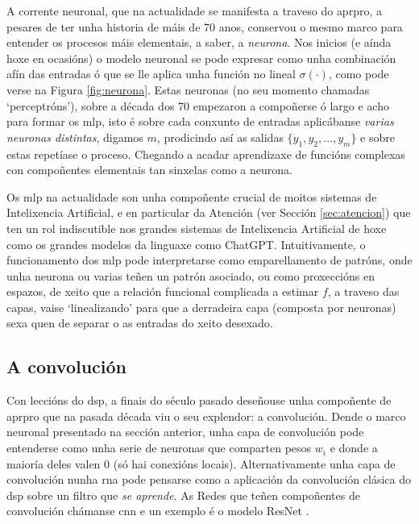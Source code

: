 A corrente neuronal, que na actualidade se manifesta a traveso do \acrshort{aprpro}, a pesares de ter unha historia de máis de 70 anos, conservou o mesmo marco para entender os procesos máis elementais, a saber, a \emph{neurona}. Nos inicios (e aínda hoxe en ocasións) o modelo neuronal se pode expresar como unha combinación afín das entradas ó que se lle aplica unha función no lineal $\sigma(\cdot)$, como pode verse na Figura \ref{fig:neurona}. Estas neuronas (no seu momento chamadas `perceptróns'), sobre a década dos 70 empezaron a compoñerse ó largo e acho para formar os \acrfull{mlp}, isto é sobre cada conxunto de entradas aplicábanse \emph{varias neuronas distintas}, digamos $m$, prodicindo así as salidas $\{y_1, y_2, \dots, y_m\}$ e sobre estas repetíase o proceso. Chegando a acadar aprendizaxe de funcións complexas con compoñentes elementais tan sinxelas como a neurona.

Os \acrshort{mlp} na actualidade son unha compoñente crucial de moitos sistemas de Intelixencia Artificial, e en particular da Atención (ver Sección \ref{sec:atencion}) que ten un rol indiscutible nos grandes sistemas de Intelixencia Artificial de hoxe como os grandes modelos da linguaxe como ChatGPT. Intuitivamente, o funcionamento dos \acrshort{mlp} pode interpretarse como emparellamento de patróns, onde unha neurona ou varias teñen un patrón asociado, ou como proxeccións en espazos, de xeito que a relación funcional complicada a estimar $f$, a traveso das capas, vaise `linealizando' para que a derradeira capa (composta por neuronas) sexa quen de separar o as entradas do xeito desexado.

\subsection{A convolución}
\label{sec:convolucion}

Con leccións do \acrshort{dsp}, a finais do século pasado deseñouse unha compoñente de \acrshort{aprpro} que na pasada década viu o seu explendor: a convolución. Dende o marco neuronal presentado na sección anterior, unha capa de convolución pode entenderse como unha serie de neuronas que comparten pesos $w_i$ e donde a maioría deles valen 0 (só hai conexións locais). Alternativamente unha capa de convolución nunha \acrshort{rna} pode pensarse como a aplicación da convolución clásica do \acrshort{dsp} sobre un filtro que \emph{se aprende}. As Redes que teñen compoñentes de convolución chámanse \acrfull{cnn} e un exemplo é o modelo ResNet \cite{resnet}.

